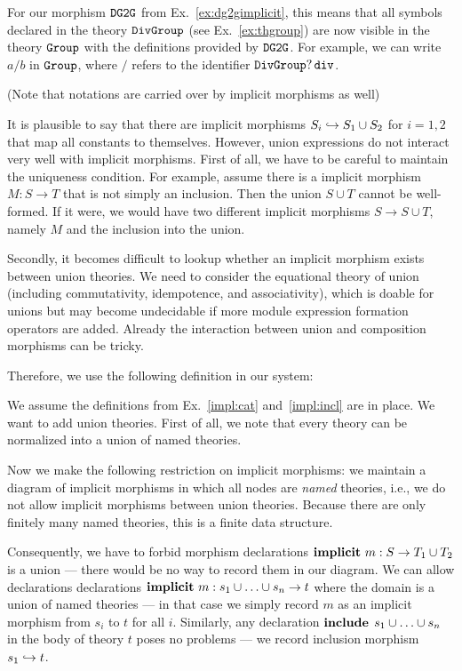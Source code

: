 \begin{example}
	For our morphism $\operatorname{\mathtt{DG2G}}$ from Ex.~\ref{ex:dg2gimplicit}, this means that all symbols declared in the theory $\operatorname{\mathtt{DivGroup}}$ (see Ex.~\ref{ex:thgroup}) are now visible in the theory $\operatorname{\mathtt{Group}}$ with the definitions provided by $\operatorname{\mathtt{DG2G}}$.
	For example, we can write $a/b$ in $\operatorname{\mathtt{Group}}$, where $/$ refers to the identifier $\operatorname{\mathtt{DivGroup}}?\operatorname{\mathtt{div}}$.
	
	(Note that notations are carried over by implicit morphisms as well)
\end{example}

\begin{union}
It is plausible to say that there are implicit morphisms $S_i\hookrightarrow S_1\cup S_2$ for $i=1,2$ that map all constants to themselves.
However, union expressions do not interact very well with implicit morphisms.
First of all, we have to be careful to maintain the uniqueness condition.
For example, assume there is a implicit morphism $M:S\to T$ that is not simply an inclusion.
Then the union $S\cup T$ cannot be well-formed.
If it were, we would have two different implicit morphisms $S\to S\cup T$, namely $M$ and the inclusion into the union.

Secondly, it becomes difficult to lookup whether an implicit morphism exists between union theories.
We need to consider the equational theory of union (including commutativity, idempotence, and associativity), which is doable for unions but may become undecidable if more module expression formation operators are added.
Already the interaction between union and composition morphisms can be tricky.

Therefore, we use the following definition in our system:

\begin{example}\label{impl:union}
We assume the definitions from Ex.~\ref{impl:cat} and~\ref{impl:incl} are in place.
We want to add union theories.
First of all, we note that every theory can be normalized into a union of named theories.

Now we make the following restriction on implicit morphisms: we maintain a diagram of implicit morphisms in which all nodes are \emph{named} theories, i.e., we do not allow implicit morphisms between union theories.
Because there are only finitely many named theories, this is a finite data structure.

Consequently, we have to forbid morphism declarations $\operatorname{\mathbf{implicit}}\,m:S\to T_1\cup T_2$ is a union --- there would be no way to record them in our diagram.
We can allow declarations declarations $\operatorname{\mathbf{implicit}}\,m:s_1\cup\ldots\cup s_n\to t$ where the domain is a union of named theories --- in that case we simply record $m$ as an implicit morphism from $s_i$ to $t$ for all $i$.
Similarly, any declaration $\operatorname{\mathbf{include}}{\;s_1\cup\ldots\cup s_n}$ in the body of theory $t$ poses no problems --- we record inclusion morphism $s_1\hookrightarrow t$.


\end{example}
\end{union}
